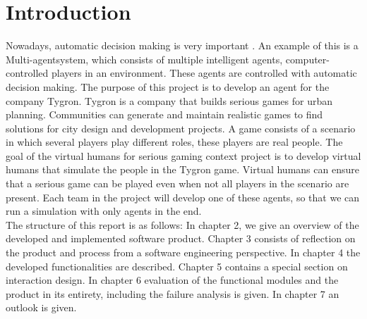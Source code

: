 \section{Introduction}
Nowadays, automatic decision making is very important \cite{Lizheng2010}. An example of this is a Multi-agentsystem, which consists of multiple intelligent agents, computer-controlled players in an environment. These agents are controlled with automatic decision making. The purpose of this project is to develop an agent for the company Tygron. Tygron is a company that builds serious games for urban planning. Communities can generate and maintain realistic games to find solutions for city design and development projects. A game consists of a scenario in which several players play different roles, these players are real people. The goal of the virtual humans for serious gaming context project is to develop virtual humans that simulate the people in the Tygron game. Virtual humans can ensure that a serious game can be played even when not all players in the scenario are present. Each team in the project will develop one of these agents, so that we can run a simulation with only agents in the end.\\

The structure of this report is as follows:
In chapter 2, we give an overview of the developed and implemented software product. Chapter 3 consists of reflection on the product and process from a software engineering perspective. In chapter 4 the developed functionalities are described. Chapter 5 contains a special section on interaction design. In chapter 6 evaluation of the functional modules and the product in its entirety, including the failure analysis is given. In chapter 7 an outlook is given.
